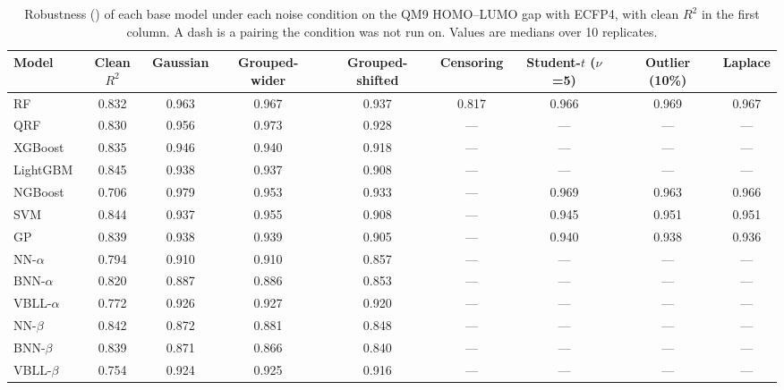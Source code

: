 \begin{table}[!htbp]
\centering
\small
\begin{adjustbox}{max width=\textwidth,max totalheight=0.78\textheight}
\begin{tabular}{lcccccccc}
\toprule
Model & Clean $R^2$ & Gaussian & Grouped-wider & Grouped-shifted & Censoring & Student-$t$ ($\nu$=5) & Outlier (10\%) & Laplace \\
\midrule
RF & 0.832 & 0.963 & 0.967 & 0.937 & 0.817 & 0.966 & 0.969 & 0.967 \\
QRF & 0.830 & 0.956 & 0.973 & 0.928 & --- & --- & --- & --- \\
XGBoost & 0.835 & 0.946 & 0.940 & 0.918 & --- & --- & --- & --- \\
LightGBM & 0.845 & 0.938 & 0.937 & 0.908 & --- & --- & --- & --- \\
NGBoost & 0.706 & 0.979 & 0.953 & 0.933 & --- & 0.969 & 0.963 & 0.966 \\
SVM & 0.844 & 0.937 & 0.955 & 0.908 & --- & 0.945 & 0.951 & 0.951 \\
GP & 0.839 & 0.938 & 0.939 & 0.905 & --- & 0.940 & 0.938 & 0.936 \\
NN-$\alpha$ & 0.794 & 0.910 & 0.910 & 0.857 & --- & --- & --- & --- \\
BNN-$\alpha$ & 0.820 & 0.887 & 0.886 & 0.853 & --- & --- & --- & --- \\
VBLL-$\alpha$ & 0.772 & 0.926 & 0.927 & 0.920 & --- & --- & --- & --- \\
NN-$\beta$ & 0.842 & 0.872 & 0.881 & 0.848 & --- & --- & --- & --- \\
BNN-$\beta$ & 0.839 & 0.871 & 0.866 & 0.840 & --- & --- & --- & --- \\
VBLL-$\beta$ & 0.754 & 0.924 & 0.925 & 0.916 & --- & --- & --- & --- \\
\bottomrule
\end{tabular}
\end{adjustbox}
\caption[Robustness of each base model under each noise condition on QM9.]{Robustness (\aucnorm) of each base model under each noise condition on the QM9 HOMO--LUMO gap with ECFP4, with clean $R^2$ in the first column. A dash is a pairing the condition was not run on. Values are medians over 10 replicates.}
\label{tab:robustness}
\end{table}


